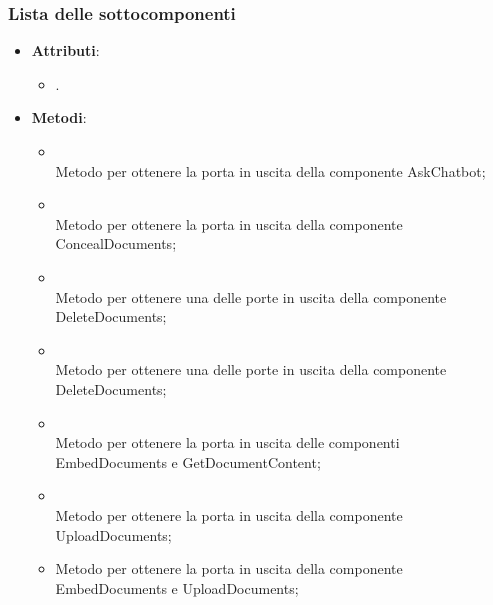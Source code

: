 \documentclass[10pt, a4paper]{article}
\begin{document}
\subsubsection{Lista delle sottocomponenti}


\label{ConfigurationManagerDettaglio}
\begin{itemize}
    \item \textbf{Attributi}:
    \begin{itemize}
        \item {}. 
    \end{itemize}
    \item \textbf{Metodi}:
    \begin{itemize}
        \item {}\\ 
        Metodo per ottenere la porta in uscita della componente AskChatbot;

        \item {}\\ 
        Metodo per ottenere la porta in uscita della componente ConcealDocuments;

        \item {}\\ 
        Metodo per ottenere una delle porte in uscita della componente DeleteDocuments;

        \item {}\\ 
        Metodo per ottenere una delle porte in uscita della componente DeleteDocuments;

        \item {}\\ 
        Metodo per ottenere la porta in uscita delle componenti EmbedDocuments e GetDocumentContent;

        \item {}\\ 
        Metodo per ottenere la porta in uscita della componente UploadDocuments;

        \item {}
        Metodo per ottenere la porta in uscita della componente EmbedDocuments e UploadDocuments;


\end{itemize}
\end{itemize}
\end{document}
